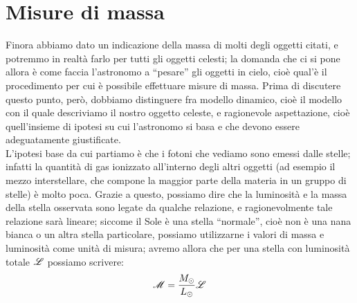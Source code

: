 \vspace{0.5cm}

\section{Misure di massa}

Finora abbiamo dato un indicazione della massa di molti degli oggetti citati, e potremmo in realtà farlo per tutti gli oggetti celesti; la domanda che ci si pone allora è come faccia l'astronomo a ``pesare'' gli oggetti in cielo, cioè qual'è il procedimento per cui è possibile effettuare misure di massa. Prima di discutere questo punto, però, dobbiamo distinguere fra modello dinamico, cioè il modello con il quale descriviamo il nostro oggetto celeste, e ragionevole aspettazione, cioè quell'insieme di ipotesi su cui l'astronomo si basa e che devono essere adeguatamente giustificate.
\\
L'ipotesi base da cui partiamo è che i fotoni che vediamo sono emessi dalle stelle; infatti la quantità di gas ionizzato all'interno degli altri oggetti (ad esempio il mezzo interstellare, che compone la maggior parte della materia in un gruppo di stelle) è molto poca. Grazie a questo, possiamo dire che la luminosità e la massa della stella osservata sono legate da qualche relazione, e ragionevolmente tale relazione sarà lineare; siccome il Sole è una stella ``normale'', cioè non è una nana bianca o un altra stella particolare, possiamo utilizzarne i valori di massa e luminosità come unità di misura; avremo allora che per una stella con luminosità totale $\mathscr{L}$ possiamo scrivere:
$$\mathscr{M}=\frac{M_{\odot}}{L_{\odot}} \mathscr{L}$$
